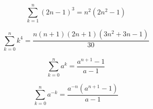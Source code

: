 \documentclass[./\jobname.tex]{subfiles}
\begin{document}
\begin{equation*}
	\sum_{k = 1}^{n} (2n - 1)^3 = n^2(2n^2 - 1)
\end{equation*}

\noindent\makebox[\linewidth]{\rule{\paperwidth}{0.4pt}}

\begin{equation*}
	\sum_{k = 0}^{n} k^4 = \frac{n(n + 1)(2n + 1)(3n^2 + 3n - 1)}{30}
\end{equation*}

\noindent\makebox[\linewidth]{\rule{\paperwidth}{0.4pt}}

\begin{equation*}
	\sum_{k = 0}^{n} a^k = \frac{a^{n+1} - 1}{a -1}
\end{equation*}

\noindent\makebox[\linewidth]{\rule{\paperwidth}{0.4pt}}

\begin{equation*}
	\sum_{k = 0}^{n} a^{-k} = \frac{a^{-n}(a^{n+1} - 1)}{a - 1}
\end{equation*}

\noindent\makebox[\linewidth]{\rule{\paperwidth}{0.4pt}}

\newpage
\end{document}
